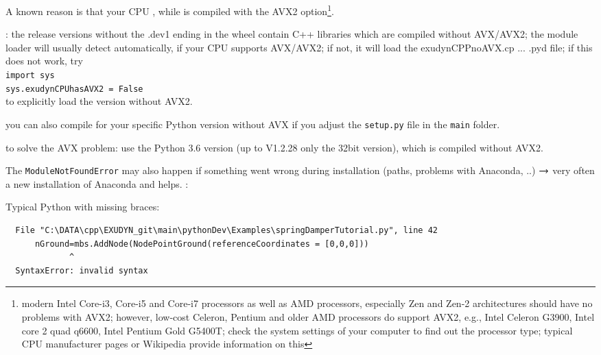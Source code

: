 \item[$\ra$] A known reason is that your CPU , while \codeName is compiled with the AVX2 option\footnote{modern Intel Core-i3, Core-i5 and Core-i7 processors as well as AMD processors, especially Zen and Zen-2 architectures should have no problems with AVX2; however, low-cost Celeron, Pentium and older AMD processors do  support AVX2, e.g.,  Intel Celeron G3900, Intel core 2 quad q6600, Intel Pentium Gold G5400T; check the system settings of your computer to find out the processor type; typical CPU manufacturer pages or Wikipedia provide information on this}.
\item[$\ra$] : the release versions without the .dev1 ending in the wheel contain C++ libraries which are compiled without AVX/AVX2; the module loader will usually detect automatically, if your CPU supports AVX/AVX2; if not, it will load the exudynCPPnoAVX.cp ... .pyd file; if this does not work, try\\
\texttt{import sys}\\
\texttt{sys.exudynCPUhasAVX2 = False}\\
to explicitly load the version without AVX2.
\item[$\ra$] you can also compile for your specific Python version without AVX if you adjust the \texttt{setup.py} file in the \texttt{main} folder.
\item[$\ra$]  to solve the AVX problem: use the Python 3.6 version (up to \codeName V1.2.28 only the 32bit version), which is compiled without AVX2.
\item[$\ra$] The \texttt{ModuleNotFoundError} may also happen if something went wrong during installation (paths, problems with Anaconda, ..) $\ra$ very often a new installation of Anaconda and \codeName helps.
\ei
\ei
\noindent {}:
\bi
  \item Typical Python  with missing braces:
\plainlststyle
\begin{lstlisting}
  File "C:\DATA\cpp\EXUDYN_git\main\pythonDev\Examples\springDamperTutorial.py", line 42
      nGround=mbs.AddNode(NodePointGround(referenceCoordinates = [0,0,0]))
             ^
  SyntaxError: invalid syntax
\end{lstlisting}
